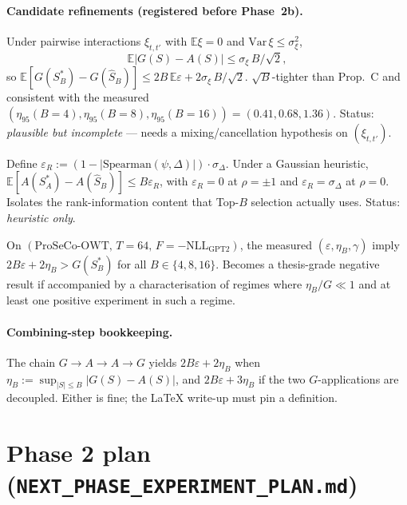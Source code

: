 \documentclass[11pt,a4paper]{article}
\newcommand{\Sopt}{S_B^{*}}
\newcommand{\Shat}{\widehat{S}_B}
\newcommand{\eps}{\varepsilon}
\newcommand{\Eb}{\mathbb{E}}
\begin{document}
\paragraph{Candidate refinements (registered before Phase~2b).}
\begin{description}[leftmargin=1.4em, style=nextline, itemsep=0.2em]
  \item[Refinement~A$'$ (variance-form $\eta_B$).] Under pairwise interactions
    $\xi_{t,t'}$ with $\Eb\xi=0$ and $\mathrm{Var}\,\xi \le \sigma_\xi^2$,
    \[
      \Eb\bigl|G(S) - A(S)\bigr| \le \sigma_\xi\, B / \sqrt{2} ,
    \]
    so $\Eb[G(\Sopt) - G(\Shat)] \le 2 B\,\Eb\eps + 2 \sigma_\xi\, B/\sqrt{2}$.
    $\sqrt{B}$-tighter than Prop.~C and consistent with the measured
    $(\eta_{95}(B{=}4),\eta_{95}(B{=}8),\eta_{95}(B{=}16)) = (0.41, 0.68, 1.36)$.
    Status: \emph{plausible but incomplete} --- needs a mixing/cancellation
    hypothesis on $(\xi_{t,t'})$.
  \item[Refinement~A$''$ (rank-based $\eps_R$).] Define
    $\eps_R := (1 - |\mathrm{Spearman}(\psi, \Delta)|) \cdot \sigma_\Delta$. Under
    a Gaussian heuristic, $\Eb[A(S_A^{*}) - A(\Shat)] \le B \eps_R$, with
    $\eps_R = 0$ at $\rho = \pm 1$ and $\eps_R = \sigma_\Delta$ at $\rho = 0$.
    Isolates the rank-information content that Top-$B$ selection actually uses.
    Status: \emph{heuristic only}.
  \item[Negative-result corollary.] On $(\text{ProSeCo-OWT},\, T{=}64,\,
    F{=}-\mathrm{NLL}_{\mathrm{GPT2}})$, the measured $(\eps, \eta_B, \gamma)$
    imply $2B\eps + 2\eta_B > G(\Sopt)$ for all $B\in\{4,8,16\}$. Becomes a
    thesis-grade negative result if accompanied by a characterisation of regimes
    where $\eta_B/G \ll 1$ and at least one positive experiment in such a regime.
\end{description}

\paragraph{Combining-step bookkeeping.} The chain $G \!\to\! A \!\to\! A \!\to\! G$
yields $2B\eps + 2\eta_B$ when $\eta_B := \sup_{|S|\le B}|G(S) - A(S)|$, and
$2B\eps + 3\eta_B$ if the two $G$-applications are decoupled. Either is fine;
the LaTeX write-up must pin a definition.

\section{Phase 2 plan (\texttt{NEXT\_PHASE\_EXPERIMENT\_PLAN.md})}
\end{document}

